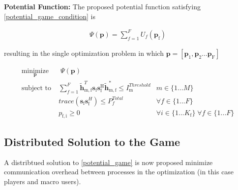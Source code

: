 \documentclass[12pt,a4paper]{report}
\begin{document}
\textbf{Potential Function:} The proposed potential function satisfying \eqref{potential_game_condition} is 

\begin{gather*} \label{Potential_Function}
\Psi(\mathbf{p}) = \sum_{f = 1}^{F} U_f(\mathbf{p_{\mathrm{f}}}) 
\end{gather*}

resulting in the single optimization problem in which $\mathbf{p}= [\mathbf{p_{\mathrm{1}}},\mathbf{p_{\mathrm{2}}}...\mathbf{p_{\mathrm{F}}}]$
	
		\begin{subequations}
	\label{optim}
	\begin{align}
	    \underset{\mathbf{p}}{\text{minimize}}
	    & \; \Psi(\mathbf{p}) \label{potential_game} \\
	    \text{subject to} \; &
	  \sum^F_{f=1} \mathbf{\tilde{h}}_{\mathrm{m,f}}^T  \mathbf{s}_{\mathrm{f}} 						
	\mathbf{s_{\mathrm{f}}^{\mathrm{H}}} \mathbf{\tilde{h}_{\mathrm{m,f}}^*} \leq I^{Threshold}		
	_{\mathrm{m}} & m \in \{1 ...M\} 
		\label{interference_const}\\
        & trace(\mathbf{s}_\mathrm{f}\mathbf{s}_\mathrm{f}^H)  \leq P^{Total}_{f}  \label{power_const}
        & \forall f \in \{1 ... F\}\\
        & p_{\mathrm{f,i}} \geq 0 &  \forall i \in \{1 ...K_{\mathrm{f}}\} \; \forall f \in \{1 ... F\}\label{pos_power_const}
	\end{align}
	\end{subequations}


\subsection{Distributed Solution to the Game}
A distribtued solution to \eqref{potential_game} is now proposed  minimize communication overhead between processes in the optimization (in this case players and macro users).
\end{document}
